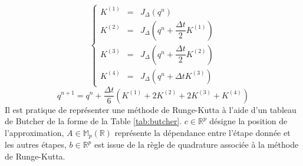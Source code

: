 \begin{equation}
\left\lbrace
\begin{array}{rcl}
K^{(1)} & = & J_{\Delta}(q^n) \\
K^{(2)} & = & J_{\Delta}\left(q^n + \dfrac{\Delta t}{2} K^{(1)}\right) \\
K^{(3)} & = & J_{\Delta}\left(q^n + \dfrac{\Delta t}{2} K^{(2)}\right) \\
K^{(4)} & = & J_{\Delta}\left(q^n + \Delta t K^{(3)}\right)
\end{array}
\right.
\label{eq:k_rk4}
\end{equation}
\begin{equation}
q^{n+1} = q^n + \dfrac{\Delta t}{6} \left( K^{(1)} + 2 K^{(2)} + 2 K^{(3)} + K^{(4)} \right)
\label{eq:assemblage_rk4}
\end{equation}
Il est pratique de représenter une méthode de Runge-Kutta à l'aide d'un tableau de Butcher \cite{Butcher2016} de la forme de la Table \ref{tab:butcher}. $c \in \mathbb{R}^p$ désigne la position de l'approximation, $A \in \mathbb{M}_p(\mathbb{R})$ représente la dépendance entre l'étape donnée et les autres étapes, $b \in \mathbb{R}^p$ est issue de la règle de quadrature associée à la méthode de Runge-Kutta.

